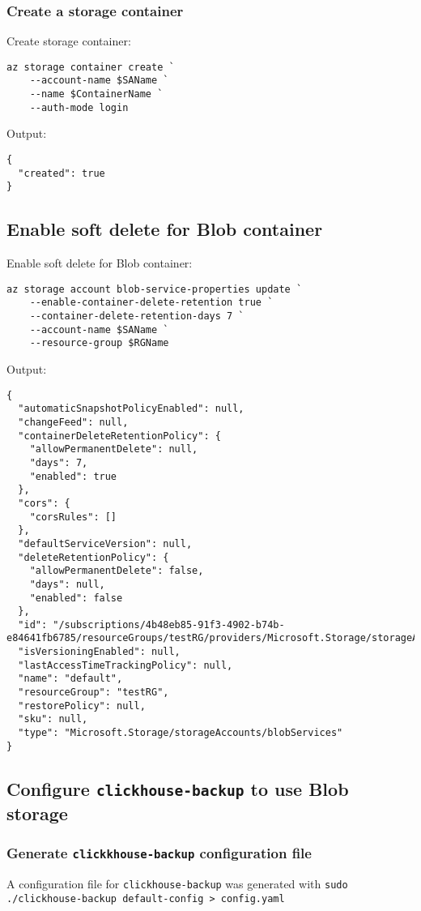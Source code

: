 \subsubsection{Create a storage container}
\label{sec:org11db3a7}
Create storage container:
\begin{verbatim}
az storage container create `
    --account-name $SAName `
    --name $ContainerName `
    --auth-mode login
\end{verbatim}

Output:
\begin{verbatim}
{
  "created": true
}
\end{verbatim}
\subsection{Enable soft delete for Blob container}
\label{sec:orgd26843b}
Enable soft delete for Blob container:
\begin{verbatim}
az storage account blob-service-properties update `
    --enable-container-delete-retention true `
    --container-delete-retention-days 7 `
    --account-name $SAName `
    --resource-group $RGName
\end{verbatim}

Output:
\begin{verbatim}
{
  "automaticSnapshotPolicyEnabled": null,
  "changeFeed": null,
  "containerDeleteRetentionPolicy": {
    "allowPermanentDelete": null,
    "days": 7,
    "enabled": true
  },
  "cors": {
    "corsRules": []
  },
  "defaultServiceVersion": null,
  "deleteRetentionPolicy": {
    "allowPermanentDelete": false,
    "days": null,
    "enabled": false
  },
  "id": "/subscriptions/4b48eb85-91f3-4902-b74b-e84641fb6785/resourceGroups/testRG/providers/Microsoft.Storage/storageAccounts/chbksa/blobServices/default",
  "isVersioningEnabled": null,
  "lastAccessTimeTrackingPolicy": null,
  "name": "default",
  "resourceGroup": "testRG",
  "restorePolicy": null,
  "sku": null,
  "type": "Microsoft.Storage/storageAccounts/blobServices"
}
\end{verbatim}
\subsection{Configure \texttt{clickhouse-backup} to use Blob storage}
\label{sec:org8552124}
\subsubsection{Generate \texttt{clickkhouse-backup} configuration file}
\label{sec:org2c08657}
A configuration file for \texttt{clickhouse-backup} was generated with
\texttt{sudo ./clickhouse-backup default-config > config.yaml}

